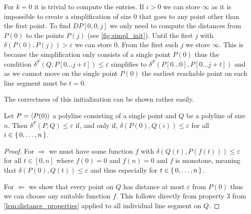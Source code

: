 For \(k = 0\) it is trivial to compute the entries. If \(i > 0\) we can store \(\infty\) as it is impossible to create a simplification of size \(0\) that goes to any point other than the first point. To find \(DP[0, 0, j]\) we only need to compute the distances from \(P(0)\) to the points \(P(j)\) (see \cref{fig:simpl_init}). Until the first \(j\) with \(\delta(P(0), P(j)) > \varepsilon\) we can store \(0\). From the first such \(j\) we store \(\infty\). This is because the simplification only consists of a single point \(P(0)\) thus the condition \(\delta^F(Q, P[0\dots j + t]) \leq \varepsilon\) simplifies to \(\delta^F(P[0 \dots 0], P[0 \dots j + t])\) and as we cannot move on the single point \(P(0)\) the earliest reachable point on each line segment must be \(t = 0\). 

The correctness of this initialization can be shown rather easily. 
\begin{lemma}
  Let \(P = \left\langle P(0)\right\rangle\) a polyline consisting of a single point and \(Q\) be a polyline of size \(n\). Then \(\delta^F(P, Q) \leq \varepsilon\) if, and only if, \(\delta(P(0), Q(i)) \leq \varepsilon\) for all \(i \in \set{0, \dots, n}\). 
\end{lemma}
\begin{proof}
  For \(\Rightarrow\) we must have some function \(f\) with \(\delta(Q(t), P(f(t))) \leq \varepsilon\) for all \(t\in [0,n]\) where \(f(0 ) = 0\) and \(f(n) = 0\) and \(f\) is  monotone, meaning that \(\delta(P(0), Q(t)) \leq \varepsilon\) and thus especially for \(t\in \set{0, \dots, n}\).
  
  For \(\Leftarrow\) we show that every point on \(Q\) has distance at most \(\varepsilon\) from \(P(0)\) thus we can choose any suitable function \(f\). This follows directly from property 3 from \cref{lem:distance_properties} applied to all individual line segment on \(Q\).
\end{proof}

